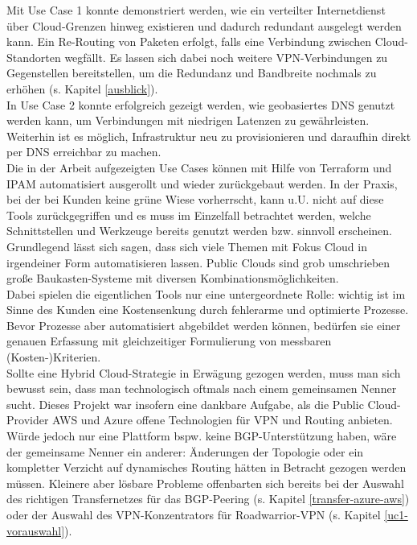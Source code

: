 Mit Use Case 1 konnte demonstriert werden, wie ein verteilter Internetdienst über Cloud-Grenzen hinweg existieren und dadurch redundant ausgelegt werden kann. Ein Re-Routing von Paketen erfolgt, falls eine Verbindung zwischen Cloud-Standorten wegfällt. Es lassen sich dabei noch weitere \gls{VPN}-Verbindungen zu Gegenstellen bereitstellen, um die Redundanz und Bandbreite nochmals zu erhöhen (s. Kapitel \ref{ausblick}).\\
In Use Case 2 konnte erfolgreich gezeigt werden, wie geobasiertes \gls{DNS} genutzt werden kann, um Verbindungen mit niedrigen Latenzen zu gewährleisten. Weiterhin ist es möglich, Infrastruktur neu zu provisionieren und daraufhin direkt per \gls{DNS} erreichbar zu machen.\\ 
Die in der Arbeit aufgezeigten Use Cases können mit Hilfe von Terraform und \gls{IPAM} automatisiert ausgerollt und wieder zurückgebaut werden. In der Praxis, bei der bei Kunden keine \glqq grüne Wiese\grqq{} vorherrscht, kann u.U. nicht auf diese Tools zurückgegriffen und es muss im Einzelfall betrachtet werden, welche Schnittstellen und Werkzeuge bereits genutzt werden bzw. sinnvoll erscheinen. Grundlegend lässt sich sagen, dass sich viele Themen mit Fokus Cloud in irgendeiner Form automatisieren lassen. Public Clouds sind grob umschrieben große \glqq Baukasten-Systeme\grqq{} mit diversen Kombinationsmöglichkeiten.\\
Dabei spielen die eigentlichen Tools nur eine untergeordnete Rolle: wichtig ist im Sinne des Kunden eine Kostensenkung durch fehlerarme und optimierte Prozesse. Bevor Prozesse aber automatisiert abgebildet werden können, bedürfen sie einer genauen Erfassung mit gleichzeitiger Formulierung von messbaren (Kosten-)Kriterien.\\
Sollte eine Hybrid Cloud-Strategie in Erwägung gezogen werden, muss man sich bewusst sein, dass man technologisch oftmals nach einem gemeinsamen Nenner sucht. Dieses Projekt war insofern eine dankbare Aufgabe, als die Public Cloud-Provider AWS und Azure offene Technologien für \gls{VPN} und Routing anbieten. Würde jedoch nur eine Plattform bspw. keine \gls{BGP}-Unterstützung haben, wäre der gemeinsame Nenner ein anderer: Änderungen der Topologie oder ein kompletter Verzicht auf dynamisches Routing hätten in Betracht gezogen werden müssen. Kleinere aber lösbare Probleme offenbarten sich bereits bei der Auswahl des richtigen Transfernetzes für das \gls{BGP}-Peering (s. Kapitel \ref{transfer-azure-aws}) oder der Auswahl des \gls{VPN-Konzentrator}s für \gls{Roadwarrior}-\gls{VPN} (s. Kapitel \ref{uc1-vorauswahl}).\\
